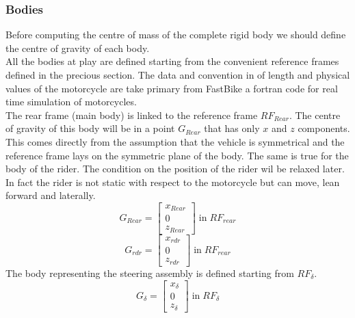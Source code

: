 \subsubsection{Bodies}
%
Before computing the centre of mass of the complete rigid body we should define the centre of gravity of each body.\\
All the bodies at play are defined starting from the convenient reference frames defined in the precious section. The data  and convention in of length and physical values of the motorcycle are take primary from FastBike a fortran code for real time simulation of motorcycles.\cite{cossalter2002motorcycle,cossalter2003multibody}\\
The rear frame (main body) is linked to the reference frame $RF_{Rear}$. The centre of gravity of this body will be in a point $G_{Rear}$ that has only $x$ and $z$ components. This comes directly from the assumption that the vehicle is symmetrical and the reference frame lays on the symmetric plane of the body. The same is true for the body of the rider. The condition on the position of the rider wil be relaxed later. In fact the rider is not static with respect to the motorcycle but can move, lean forward and laterally.
%
\begin{equation}
    G_{Rear} =
    \left[
    \begin{array}{c}
        x_{Rear}\\
        0\\
        z_{Rear}
    \end{array}
    \right]
    \; \text{in} \; RF_{rear}
\end{equation}
%
\begin{equation}
    G_{rdr} =
    \left[
    \begin{array}{c}
        x_{rdr}\\
        0\\
        z_{rdr}
    \end{array}
    \right]
    \; \text{in} \; RF_{rear}
\end{equation}
%
The body representing the steering assembly is defined starting from $RF_\delta$.
%
\begin{equation}
    G_{\delta} =
    \left[
    \begin{array}{c}
        x_{\delta}\\
        0\\
        z_{\delta}
    \end{array}
    \right]
    \; \text{in} \; RF_{\delta}
\end{equation}
